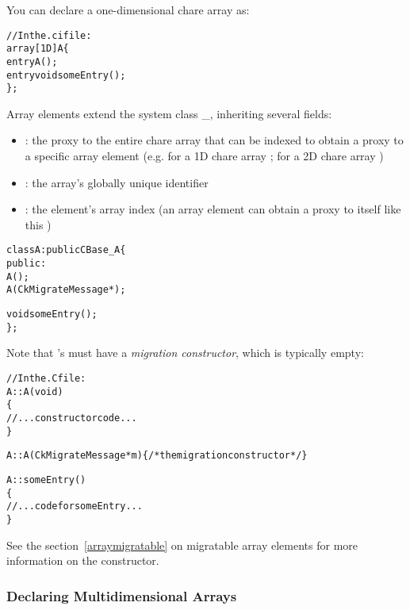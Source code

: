 You can declare a one-dimensional chare array
as:
%
\begin{alltt}
//In the .ci file:
array [1D] A \{
  entry A();
  entry void someEntry();
\};
\end{alltt}
%
Array elements extend the system class \_, inheriting
several fields:
%
\begin{itemize}
\item {}: the proxy to the entire chare array that can be indexed
  to obtain a proxy to a specific array element (e.g. for a 1D chare array
  ; for a 2D chare array )
\item {}: the array's globally unique identifier
\item {}: the element's array index (an array element can obtain a
  proxy to itself like this )
\end{itemize}
%
%
\begin{alltt}
class A : public CBase\_A \{
  public:
    A();
    A(CkMigrateMessage *);

    void someEntry();
\};
\end{alltt}
%
Note that 's must have a \emph{migration constructor}, which is typically
empty:
%
\begin{alltt}
//In the .C file:
A::A(void)
\{
  //... constructor code ...
\}

A::A(CkMigrateMessage *m) \{ /* the migration constructor */ \}

A::someEntry()
\{
  // ... code for someEntry ...
\}
\end{alltt}
%
See the section~\ref{arraymigratable} on migratable array elements for more
information on the  constructor.

\subsubsection{Declaring Multidimensional Arrays}

